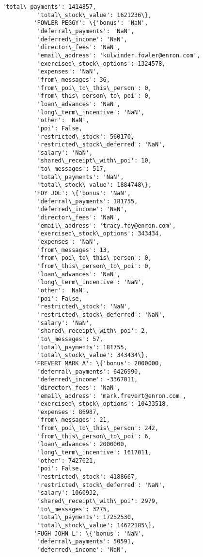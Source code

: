 \documentclass[11pt]{article}
\begin{document}
\begin{Verbatim}[commandchars=\\\{\}]
          'total\_payments': 1414857,
          'total\_stock\_value': 1621236\},
         'FOWLER PEGGY': \{'bonus': 'NaN',
          'deferral\_payments': 'NaN',
          'deferred\_income': 'NaN',
          'director\_fees': 'NaN',
          'email\_address': 'kulvinder.fowler@enron.com',
          'exercised\_stock\_options': 1324578,
          'expenses': 'NaN',
          'from\_messages': 36,
          'from\_poi\_to\_this\_person': 0,
          'from\_this\_person\_to\_poi': 0,
          'loan\_advances': 'NaN',
          'long\_term\_incentive': 'NaN',
          'other': 'NaN',
          'poi': False,
          'restricted\_stock': 560170,
          'restricted\_stock\_deferred': 'NaN',
          'salary': 'NaN',
          'shared\_receipt\_with\_poi': 10,
          'to\_messages': 517,
          'total\_payments': 'NaN',
          'total\_stock\_value': 1884748\},
         'FOY JOE': \{'bonus': 'NaN',
          'deferral\_payments': 181755,
          'deferred\_income': 'NaN',
          'director\_fees': 'NaN',
          'email\_address': 'tracy.foy@enron.com',
          'exercised\_stock\_options': 343434,
          'expenses': 'NaN',
          'from\_messages': 13,
          'from\_poi\_to\_this\_person': 0,
          'from\_this\_person\_to\_poi': 0,
          'loan\_advances': 'NaN',
          'long\_term\_incentive': 'NaN',
          'other': 'NaN',
          'poi': False,
          'restricted\_stock': 'NaN',
          'restricted\_stock\_deferred': 'NaN',
          'salary': 'NaN',
          'shared\_receipt\_with\_poi': 2,
          'to\_messages': 57,
          'total\_payments': 181755,
          'total\_stock\_value': 343434\},
         'FREVERT MARK A': \{'bonus': 2000000,
          'deferral\_payments': 6426990,
          'deferred\_income': -3367011,
          'director\_fees': 'NaN',
          'email\_address': 'mark.frevert@enron.com',
          'exercised\_stock\_options': 10433518,
          'expenses': 86987,
          'from\_messages': 21,
          'from\_poi\_to\_this\_person': 242,
          'from\_this\_person\_to\_poi': 6,
          'loan\_advances': 2000000,
          'long\_term\_incentive': 1617011,
          'other': 7427621,
          'poi': False,
          'restricted\_stock': 4188667,
          'restricted\_stock\_deferred': 'NaN',
          'salary': 1060932,
          'shared\_receipt\_with\_poi': 2979,
          'to\_messages': 3275,
          'total\_payments': 17252530,
          'total\_stock\_value': 14622185\},
         'FUGH JOHN L': \{'bonus': 'NaN',
          'deferral\_payments': 50591,
          'deferred\_income': 'NaN',

\end{Verbatim}
\end{document}
